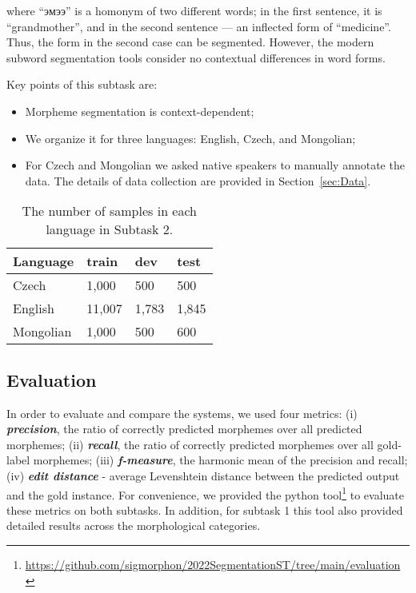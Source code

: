 \documentclass[11pt]{article}
\begin{document}
\noindent where ``\foreignlanguage{russian}{эмээ}'' is a homonym of two different words; in the first sentence, it is ``grandmother'', and in the second sentence --- an inflected form of ``medicine''. Thus, the form in the second case can be segmented. However, the modern subword segmentation tools consider no contextual differences in word forms.


Key points of this subtask are:
\begin{itemize}
\item Morpheme segmentation is context-dependent;
\item We organize it for three languages: English, Czech, and Mongolian;
\item For Czech and Mongolian we asked native speakers to manually annotate the data. The details of data collection are provided in Section~\ref{sec:Data}.

\end{itemize}


\begin{table}[t]
\centering
\begin{tabularx}{0.9\linewidth}{lRRR}
\hline
Language & train & dev  & test \\
\hline
Czech     & 1,000  & 500  & 500  \\
English   & 11,007 & 1,783 & 1,845 \\
Mongolian & 1,000  & 500  & 600 \\

\hline
\end{tabularx}
\caption{\label{tab:task2stats}The number of samples in each language in Subtask 2.}
\end{table}


\subsection{Evaluation}
In order to evaluate and compare the systems, we used four metrics: (i) \textit{\textbf{precision}}, the ratio of correctly predicted morphemes over all predicted morphemes; (ii) \textit{\textbf{recall}}, the ratio of correctly predicted morphemes over all gold-label morphemes; (iii) \textit{\textbf{f-measure}},  the harmonic mean of the precision and recall;
(iv) \textit{\textbf{edit distance}} - average Levenshtein distance between the predicted output and the gold instance. For convenience, we provided the python tool\footnote{\url{https://github.com/sigmorphon/2022SegmentationST/tree/main/evaluation}} to evaluate these metrics on both subtasks. In addition, for subtask 1 this tool also provided detailed results across the morphological categories. 
\end{document}
